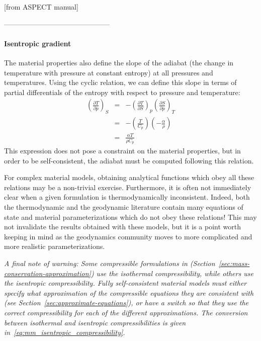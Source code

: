 

[from ASPECT manual]



---------------------------------------------
\paragraph{Isentropic gradient}

The material properties also define the slope of the adiabat (the change in temperature with
pressure at constant entropy) at all pressures and temperatures. Using the cyclic relation,
we can define this slope in terms of partial differentials of the entropy with respect to pressure
and temperature:
\begin{eqnarray}
\left( \frac{\partial T}{\partial p} \right)_{S} 
&=& - \left( \frac{\partial T}{\partial S} \right)_{p} \left( \frac{\partial S}{\partial p} \right)_{T} \\
&=& - \left( \frac{T}{C_p} \right) \left( - \frac{\alpha}{\rho} \right) \\
&=& \frac{\alpha T}{\rho C_p} \label{eq:mm_isentropic_gradient}
\end{eqnarray}
This expression does not pose a constraint on the material properties, but in order to be 
self-consistent, the adiabat must be computed following this relation.

For complex material models, obtaining analytical functions which obey all these relations
may be a non-trivial exercise. Furthermore, it is often not immediately clear when a
given formulation is thermodynamically inconsistent. Indeed, both the
thermodynamic and the geodynamic literature contain many equations of
state and material parameterizations which do not obey these 
relations! This may not invalidate the results obtained with these 
models, but it is a point worth keeping in mind as the geodynamics
community moves to more complicated and more realistic parameterizations.

\emph{A final note of warning: Some compressible formulations in \aspect{}
  (Section~\ref{sec:mass-conservation-approximation}) use the isothermal compressibility,
  while others use the isentropic compressibility. Fully self-consistent material models must
  either specify what approximation of the compressible equations they are consistent with
  (see Section~\ref{sec:approximate-equations}), or have a switch so that they use the correct
  compressibility for each of the different approximations. The conversion between isothermal
  and isentropic compressibilities is given in~\eqref{eq:mm_isentropic_compressibility}.}

